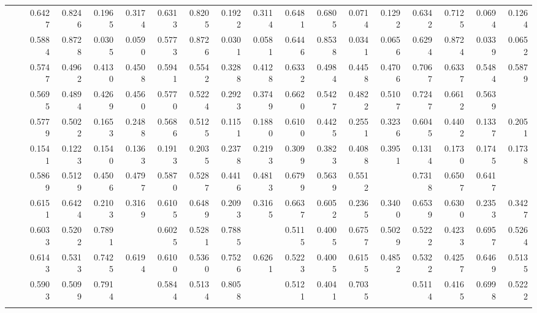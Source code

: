 {\begin{table*}[t]
{\begin{tabular}{|l|l|r|r|r|r|r|r|r|r|r|r|r|r|r|r|r|r|}
				\comment{
				\multirow{11}{*}{\rotatebox{90}{\Cora}} 
				&\ATC        & 0.6427 & 0.8246 & 0.1965 & 0.3174 & 0.6313 & 0.8205 & 0.1922 & 0.3114 & 0.6481 & 0.6805 & 0.0714 & 0.1292 & 0.6342 & 0.7125 & 0.0694 & 0.1264 \\
				&\CTC        & 0.5884 & 0.8728 & 0.0305 & 0.0590 & 0.5773 & 0.8726 & 0.0301 & 0.0581 & 0.6446 & 0.8538 & 0.0341 & 0.0656 & 0.6294 & 0.8724 & 0.0339 & 0.0652 \\\cline{2-18}
				&\MAML       & 0.5747 & 0.4962 & 0.4130 & 0.4508 & 0.5941 & 0.5542 & 0.3288 & 0.4128 & 0.6332 & 0.4984 & 0.4458 & 0.4706 & 0.7067 & 0.6337 & 0.5484 & 0.5879 \\
				&\Reptile    & 0.5695 & 0.4894 & 0.4269 & 0.4560 & 0.5770 & 0.5224 & 0.2923 & 0.3749 & 0.6620 & 0.5427 & 0.4822 & 0.5107 &0.7247       & 0.6612       &0.5639        &\cellcolor{LightCyan}{0.6087}        \\
				&\Featrans  & 0.5779 & 0.5022 & 0.1653 & 0.2488 & 0.5686 & 0.5125 & 0.1151 & 0.1880 & 0.6100 & 0.4425 & 0.2551 & 0.3236 & 0.6045 & 0.4402 & 0.1337 & 0.2051 \\
				&\PN        & 0.1541 & 0.1223 & 0.1540 & 0.1363 & 0.1913 & 0.2035 & 0.2378 & 0.2193 & 0.3099 & 0.3823 & 0.4088 & 0.3951 & 0.1314 & 0.1730 & 0.1745 & 0.1738 \\\cline{2-18}
				&\Supervise & 0.5869 & 0.5129 & 0.4506 & 0.4797 & 0.5870 & 0.5287 & 0.4416 & 0.4813 & 0.6799 & 0.5639 & 0.5512 & \cellcolor{LightRed}{0.5575} & 0.7318 & 0.6507 & 0.6417 & \cellcolor{LightRed}{0.6462} \\
				&\ICSGNN    & 0.6151 & 0.6424 & 0.2103 & 0.3169 & 0.6105 & 0.6489 & 0.2093 & 0.3165 & 0.6637 & 0.6052 & 0.2365 & 0.3400 & 0.6539 & 0.6300 & 0.2353 & 0.3427 \\\cline{2-18}
				&\CGNPIP    & 0.6033 & 0.5202 & 0.7891 & \cellcolor{LightRed}{0.6271 } &0.6025 & 0.5281 & 0.7885 & \cellcolor{LightRed}{0.6325} & 0.5115 & 0.4005 & 0.6757 & 0.5029 & 0.5222 & 0.4233 & 0.6957 & 0.5264 \\
				&\CGNPMLP   & 0.6143 & 0.5313 & 0.7425 & 0.6194 & 0.6100 & 0.5360 & 0.7526 & 0.6261 & 0.5223 & 0.4005 & 0.6155 & 0.4852 & 0.5322 & 0.4257 & 0.6469 & 0.5135 \\
				&\CGNPGNN   & 0.5903 & 0.5099 & 0.7914 & \cellcolor{LightCyan}{0.6202} & 0.5844 & 0.5134 & 0.8058 & \cellcolor{LightCyan}{0.6272} & 0.5121 & 0.4041 & 0.7035 & \cellcolor{LightCyan}{0.5134} & 0.5114 & 0.4165 & 0.6998 & 0.5222\\\hline\hline
			    }
		

\end{tabular}}
\end{table*}}
